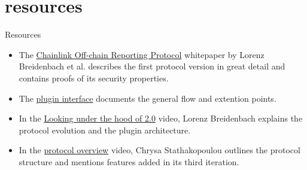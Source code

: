\documentclass{article}
\begin{document}
\section{resources}{Resources}

\begin{itemize}
    \item The \href{https://research.chain.link/ocr.pdf}{Chainlink Off-chain Reporting Protocol} whitepaper by Lorenz Breidenbach et al. describes the first protocol version in great detail and contains proofs of its security properties.
    \item The \href{https://github.com/smartcontractkit/libocr/blob/6359502d2ff1165c7e6b77b9eff2c5a46a7a4fbb/offchainreporting2plus/ocr3types/plugin.go#L94}{ plugin interface} documents the general flow and extention points.
    \item In the \href{https://youtu.be/XKiLkmwVaYA}{Looking under the hood of  2.0} video, Lorenz Breidenbach explains the protocol evolution and the plugin architecture.
    \item In the \href{https://youtu.be/VPVH3QCwc0U}{ protocol overview} video, Chrysa Stathakopoulou outlines the protocol structure and mentions features added in its third iteration.
\end{itemize}
\end{document}
